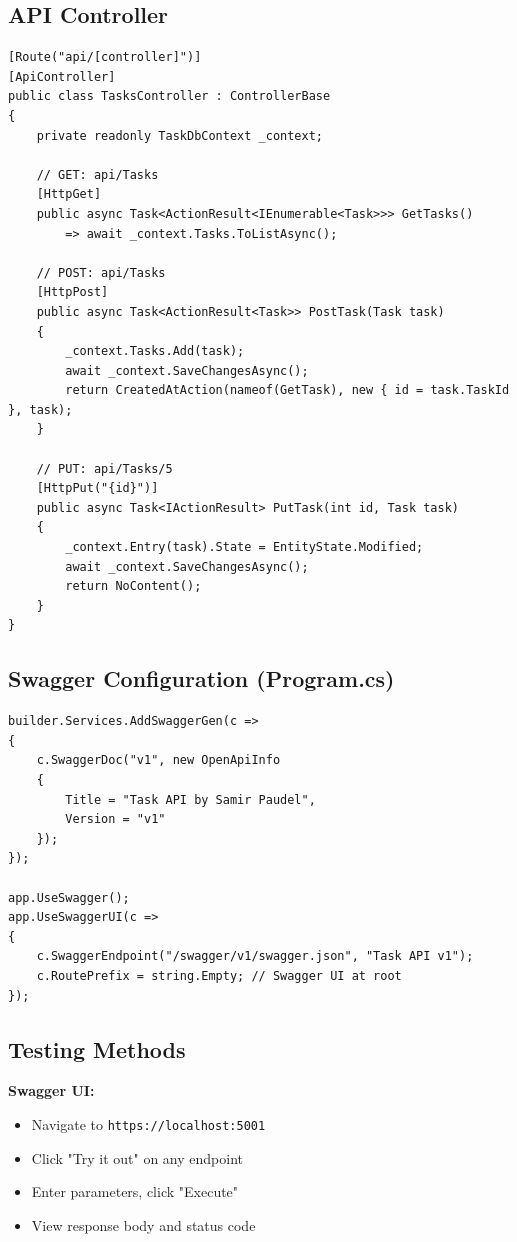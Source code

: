 \documentclass[10pt,a4paper]{article}
\begin{document}
\subsection*{API Controller}
\begin{lstlisting}[basicstyle=\ttfamily\tiny]
[Route("api/[controller]")]
[ApiController]
public class TasksController : ControllerBase
{
    private readonly TaskDbContext _context;
    
    // GET: api/Tasks
    [HttpGet]
    public async Task<ActionResult<IEnumerable<Task>>> GetTasks()
        => await _context.Tasks.ToListAsync();
    
    // POST: api/Tasks
    [HttpPost]
    public async Task<ActionResult<Task>> PostTask(Task task)
    {
        _context.Tasks.Add(task);
        await _context.SaveChangesAsync();
        return CreatedAtAction(nameof(GetTask), new { id = task.TaskId }, task);
    }
    
    // PUT: api/Tasks/5
    [HttpPut("{id}")]
    public async Task<IActionResult> PutTask(int id, Task task)
    {
        _context.Entry(task).State = EntityState.Modified;
        await _context.SaveChangesAsync();
        return NoContent();
    }
}
\end{lstlisting}

\subsection*{Swagger Configuration (Program.cs)}
\begin{lstlisting}[basicstyle=\ttfamily\tiny]
builder.Services.AddSwaggerGen(c =>
{
    c.SwaggerDoc("v1", new OpenApiInfo
    {
        Title = "Task API by Samir Paudel",
        Version = "v1"
    });
});

app.UseSwagger();
app.UseSwaggerUI(c =>
{
    c.SwaggerEndpoint("/swagger/v1/swagger.json", "Task API v1");
    c.RoutePrefix = string.Empty; // Swagger UI at root
});
\end{lstlisting}

\subsection*{Testing Methods}

\textbf{Swagger UI:}
\begin{itemize}
    \item Navigate to \texttt{https://localhost:5001}
    \item Click "Try it out" on any endpoint
    \item Enter parameters, click "Execute"
    \item View response body and status code
\end{itemize}
\end{document}
